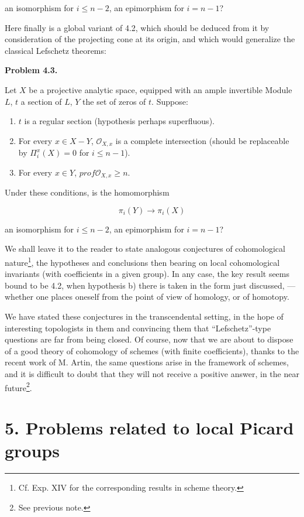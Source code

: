 \documentclass[
  11pt,
  a4paper,
]{book}
\begin{document}
an isomorphism for \(i \leqslant n - 2\), an epimorphism for
\(i = n - 1\)?

Here finally is a global variant of 4.2, which should be deduced from it
by consideration of the projecting cone at its origin, and which would
generalize the classical Lefschetz theorems:

\textbf{Problem 4.3.}

Let \(X\) be a projective analytic space, equipped with an ample
invertible Module \(L\), \(t\) a section of \(L\), \(Y\) the set of
zeros of \(t\). Suppose:

\begin{enumerate}
\def\labelenumi{\alph{enumi})}
\item
  \(t\) is a regular section (hypothesis perhaps superfluous).
\item
  For every \(x \in X - Y\), \(\mathcal{O}_{X,x}\) is a complete
  intersection (should be replaceable by \(\Pi^{x}_{i}(X) =
  0\) for \(i \leqslant n - 1\)).
\item
  For every \(x \in Y\), \(prof \mathcal{O}_{X,x} \geqslant n\).
\end{enumerate}

Under these conditions, is the homomorphism

\[ \pi_{i}(Y) \to \pi_{i}(X) \]

an isomorphism for \(i \leqslant n - 2\), an epimorphism for
\(i = n - 1\)?

We shall leave it to the reader to state analogous conjectures of
cohomological nature\footnote{Cf. Exp. XIV for the corresponding results
  in scheme theory.}, the hypotheses and conclusions then bearing on
local cohomological invariants (with coefficients in a given group). In
any case, the key result seems bound to be 4.2, when hypothesis b) there
is taken in the form just discussed, --- whether one places oneself from
the point of view of homology, or of homotopy.

We have stated these conjectures in the transcendental setting, in the
hope of interesting topologists in them and convincing them that
``Lefschetz''-type questions are far from being closed. Of course, now
that we are about to dispose of a good theory of cohomology of schemes
(with finite coefficients), thanks to the recent work of M. Artin, the
same questions arise in the framework of schemes, and it is difficult to
doubt that they will not receive a positive answer, in the near
future\footnote{See previous note.}.

\section{5. Problems related to local Picard
groups}\label{problems-related-to-local-picard-groups}
\end{document}

